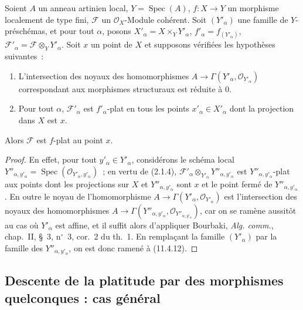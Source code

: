 \begin{corollary}[11.4.13]
\label{IV.11.4.13-fr}
Soient $A$ un anneau artinien local, $Y=\operatorname{Spec}(A)$,
$f:X\to Y$ un morphisme localement de type fini, $\mathcal F$ un
$\mathcal O_X$-Module cohérent. Soit $(Y'_\alpha)$ une famille de
$Y$-préschémas, et pour tout $\alpha$, posons
$X'_\alpha=X\times_Y Y'_\alpha$, $f'_\alpha=f_{(Y'_\alpha)}$,
$\mathcal F'_\alpha=\mathcal F\otimes_Y Y'_\alpha$. Soit $x$ un point de $X$ et
supposons vérifiées les hypothèses suivantes~:
\begin{enumerate}[label=(\roman*)]
  \item L'intersection des noyaux des homomorphismes
  $A\to\Gamma(Y'_\alpha,\mathcal O_{Y'_\alpha})$ correspondant aux morphismes
  structuraux est réduite à $0$.
  \item Pour tout $\alpha$, $\mathcal F'_\alpha$ est $f'_\alpha$-plat en tous
  les points $x'_\alpha\in X'_\alpha$ dont la projection dans $X$ est $x$.
\end{enumerate}
Alors $\mathcal F$ est $f$-plat au point $x$.
\end{corollary}

\begin{proof}
En effet, pour tout $y'_\alpha\in Y'_\alpha$, considérons le schéma local
$Y''_{\alpha,y'_\alpha}=\operatorname{Spec}(\mathcal O_{Y'_\alpha,y'_\alpha})$~;
en vertu de (2.1.4),
$\mathcal F'_\alpha\otimes_{Y'_\alpha}Y''_{\alpha,y'_\alpha}$ est
$Y''_{\alpha,y'_\alpha}$-plat aux points dont les projections sur $X$ et
$Y''_{\alpha,y'_\alpha}$ sont $x$ et le point fermé de
$Y''_{\alpha,y'_\alpha}$. En outre le noyau de l'homomorphisme
$A\to\Gamma(Y'_\alpha,\mathcal O_{Y'_\alpha})$ est l'intersection des noyaux
des homomorphismes
$A\to\Gamma(Y''_{\alpha,y'_\alpha},\mathcal O_{Y''_{\alpha,y'_\alpha}})$, car
on se ramène aussitôt au cas où $Y'_\alpha$ est affine, et il suffit alors
d'appliquer Bourbaki, \emph{Alg. comm.}, chap.~II, \S~3, n$^\circ$~3, cor.~2 du
th.~1. En remplaçant la famille $(Y'_\alpha)$ par la famille des
$Y''_{\alpha,y'_\alpha}$, on est donc ramené à (11.4.12).
\end{proof}

\subsection{Descente de la platitude par des morphismes quelconques : cas général}
\label{subsection:IV.11.5-fr}

